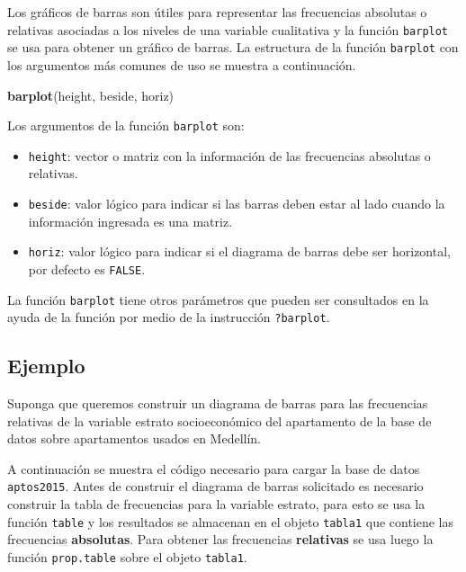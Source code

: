 \documentclass[10pt,]{krantz}
\makeatletter
\newenvironment{Shaded}{\begin{snugshade}}{\end{snugshade}}
\newcommand{\KeywordTok}[1]{\textcolor[rgb]{0.13,0.29,0.53}{\textbf{#1}}}
\newcommand{\NormalTok}[1]{#1}
\providecommand{\tightlist}{%
  \setlength{\itemsep}{0pt}\setlength{\parskip}{0pt}}
\newenvironment{kframe}{%
\medskip{}
\setlength{\fboxsep}{.8em}
 \def\at@end@of@kframe{}%
 \ifinner\ifhmode%
  \def\at@end@of@kframe{\end{minipage}}%
  \begin{minipage}{\columnwidth}%
 \fi\fi%
 \def\FrameCommand##1{\hskip\@totalleftmargin \hskip-\fboxsep
 \colorbox{shadecolor}{##1}\hskip-\fboxsep
     \hskip-\linewidth \hskip-\@totalleftmargin \hskip\columnwidth}%
 \MakeFramed {\advance\hsize-\width
   \@totalleftmargin\z@ \linewidth\hsize
   \@setminipage}}%
 {\par\unskip\endMakeFramed%
 \at@end@of@kframe}
\renewenvironment{Shaded}{\begin{kframe}}{\end{kframe}}
\makeatother
\begin{document}
Los gráficos de barras son útiles para representar las frecuencias
absolutas o relativas asociadas a los niveles de una variable
cualitativa y la función \texttt{barplot} se usa para obtener un gráfico
de barras. La estructura de la función \texttt{barplot} con los
argumentos más comunes de uso se muestra a continuación.

\begin{Shaded}
\begin{Highlighting}[]
\KeywordTok{barplot}\NormalTok{(height, beside, horiz)}
\end{Highlighting}
\end{Shaded}

Los argumentos de la función \texttt{barplot} son:

\begin{itemize}
\tightlist
\item
  \texttt{height}: vector o matriz con la información de las frecuencias
  absolutas o relativas.
\item
  \texttt{beside}: valor lógico para indicar si las barras deben estar
  al lado cuando la información ingresada es una matriz.
\item
  \texttt{horiz}: valor lógico para indicar si el diagrama de barras
  debe ser horizontal, por defecto es \texttt{FALSE}.
\end{itemize}

La función \texttt{barplot} tiene otros parámetros que pueden ser
consultados en la ayuda de la función por medio de la instrucción
\texttt{?barplot}.

\subsection*{Ejemplo}\label{ejemplo-28}


Suponga que queremos construir un diagrama de barras para las
frecuencias relativas de la variable estrato socioeconómico del
apartamento de la base de datos sobre apartamentos usados en Medellín.

A continuación se muestra el código necesario para cargar la base de
datos \texttt{aptos2015}. Antes de construir el diagrama de barras
solicitado es necesario construir la tabla de frecuencias para la
variable estrato, para esto se usa la función \texttt{table} y los
resultados se almacenan en el objeto \texttt{tabla1} que contiene las
frecuencias \textbf{absolutas}. Para obtener las frecuencias
\textbf{relativas} se usa luego la función \texttt{prop.table} sobre el
objeto \texttt{tabla1}.
\end{document}
